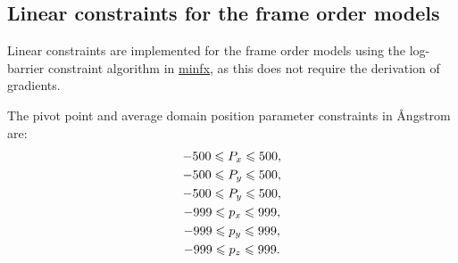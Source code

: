 \subsection{Linear constraints for the frame order models}

Linear constraints are implemented for the frame order models using the log-barrier constraint algorithm in \href{https://gna.org/projects/minfx/}{minfx}, as this does not require the derivation of gradients.

The pivot point and average domain position parameter constraints in \AA ngstrom are:
\begin{subequations}
\begin{gather}
    -500 \leqslant P_x \leqslant 500, \\
    -500 \leqslant P_y \leqslant 500, \\
    -500 \leqslant P_y \leqslant 500, \\
    -999 \leqslant p_x \leqslant 999, \\
    -999 \leqslant p_y \leqslant 999, \\
    -999 \leqslant p_z \leqslant 999.
\end{gather}
\end{subequations}

